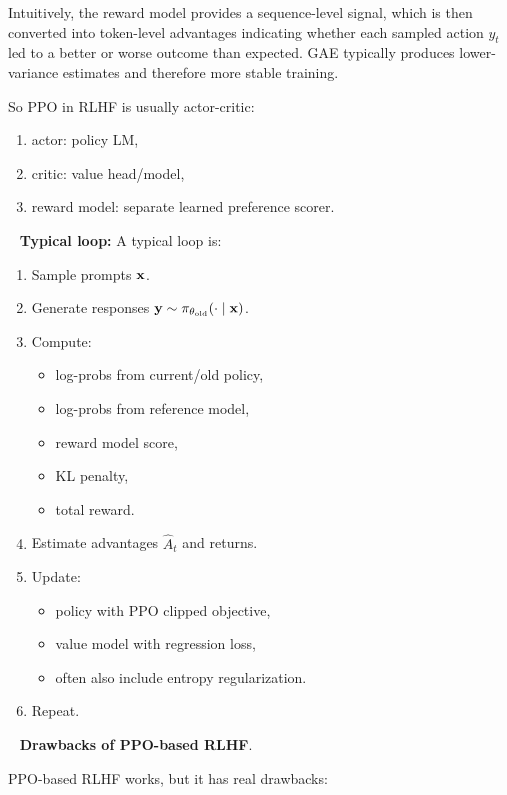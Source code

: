 \documentclass[11pt]{article}  %
\begin{document}
Intuitively, the reward model provides a sequence-level signal, which is then converted into token-level advantages indicating whether each sampled action $y_t$ led to a better or worse outcome than expected. GAE typically produces lower-variance estimates and therefore more stable training.


So PPO in RLHF is usually actor-critic:
\begin{enumerate}
  \item actor: policy LM,
  \item critic: value head/model,
  \item reward model: separate learned preference scorer.
\end{enumerate}

\textbullet~ \textbf{Typical loop:} A typical loop is:
\begin{enumerate}
  \item Sample prompts $\mathbf{x}$.

  \item Generate responses $\mathbf{y} \sim \pi_{\theta_{\mathrm{old}}}(\cdot \mid \mathbf{x})$.

  \item Compute:
  \begin{itemize}
  \item log-probs from current/old policy,
  \item log-probs from reference model,
  \item reward model score,
  \item KL penalty,
  \item total reward.
  \end{itemize}

  \item Estimate advantages $\hat{A}_t$ and returns.

  \item Update:
  \begin{itemize}
  \item policy with PPO clipped objective,
  \item value model with regression loss,
  \item often also include entropy regularization.
  \end{itemize}

  \item Repeat.
\end{enumerate}

\textbullet~ \textbf{Drawbacks of PPO-based RLHF}.

PPO-based RLHF works, but it has real drawbacks:
\end{document}
